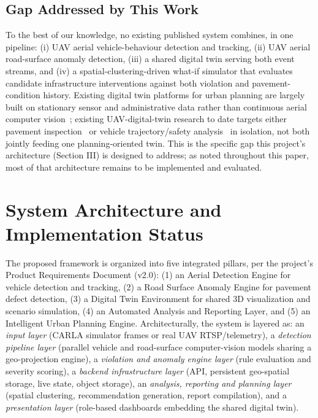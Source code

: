 \documentclass[conference]{IEEEtran}
\begin{document}
\subsection{Gap Addressed by This Work}

To the best of our knowledge, no existing published system combines, in one pipeline: (i) UAV aerial vehicle-behaviour detection and tracking, (ii) UAV aerial road-surface anomaly detection, (iii) a shared digital twin serving both event streams, and (iv) a spatial-clustering-driven what-if simulator that evaluates candidate infrastructure interventions against both violation and pavement-condition history. Existing digital twin platforms for urban planning are largely built on stationary sensor and administrative data rather than continuous aerial computer vision~\cite{gravel2gavel,kgt2026}; existing UAV-digital-twin research to date targets either pavement inspection~\cite{uavpavement} or vehicle trajectory/safety analysis~\cite{citysim,trafficsafetytwin} in isolation, not both jointly feeding one planning-oriented twin. This is the specific gap this project's architecture (Section III) is designed to address; as noted throughout this paper, most of that architecture remains to be implemented and evaluated.

\section{System Architecture and Implementation Status}

The proposed framework is organized into five integrated pillars, per the project's Product Requirements Document (v2.0): (1) an Aerial Detection Engine for vehicle detection and tracking, (2) a Road Surface Anomaly Engine for pavement defect detection, (3) a Digital Twin Environment for shared 3D visualization and scenario simulation, (4) an Automated Analysis and Reporting Layer, and (5) an Intelligent Urban Planning Engine. Architecturally, the system is layered as: an \textit{input layer} (CARLA simulator frames or real UAV RTSP/telemetry), a \textit{detection pipeline layer} (parallel vehicle and road-surface computer-vision models sharing a geo-projection engine), a \textit{violation and anomaly engine layer} (rule evaluation and severity scoring), a \textit{backend infrastructure layer} (API, persistent geo-spatial storage, live state, object storage), an \textit{analysis, reporting and planning layer} (spatial clustering, recommendation generation, report compilation), and a \textit{presentation layer} (role-based dashboards embedding the shared digital twin).
\end{document}
